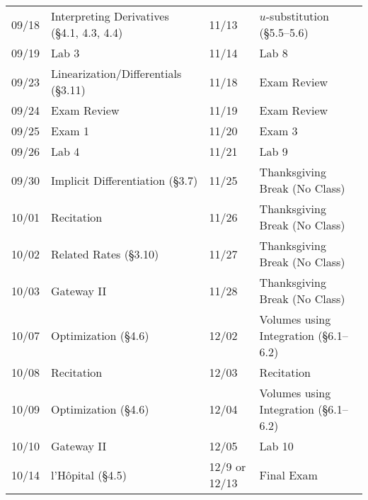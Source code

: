 \documentclass[11pt,letterpaper]{article}
\begin{document}
\begin{table}[!ht]
{\begin{tabular}{ll || ll}
	09/18 & Interpreting Derivatives (\S4.1, 4.3, 4.4) & 11/13 & $u$-substitution (\S5.5--5.6) \\
	09/19 & Lab 3 & 11/14 & Lab 8 \\
	09/23 & Linearization/Differentials (\S3.11) & 11/18 & Exam Review \\
	09/24 & Exam Review & 11/19 & Exam Review \\
	09/25 & Exam 1 & 11/20 & Exam 3 \\
	09/26 & Lab 4 & 11/21 & Lab 9 \\
	09/30 & Implicit Differentiation (\S3.7) & 11/25 & Thanksgiving Break (No Class) \\
	10/01 & Recitation & 11/26 & Thanksgiving Break (No Class) \\
	10/02 & Related Rates (\S3.10) & 11/27 & Thanksgiving Break (No Class) \\
	10/03 & Gateway II & 11/28 & Thanksgiving Break (No Class) \\
	10/07 & Optimization (\S4.6) & 12/02 & Volumes using Integration (\S6.1--6.2) \\
	10/08 & Recitation & 12/03 & Recitation \\	
	10/09 & Optimization (\S4.6) & 12/04 & Volumes using Integration (\S6.1--6.2) \\
	10/10 & Gateway II & 12/05 & Lab 10 \\
	10/14 & l'H\^{o}pital (\S4.5) & 12/9 or 12/13 & Final Exam
        \end{tabular}
        }
        \end{table}
\end{document}
